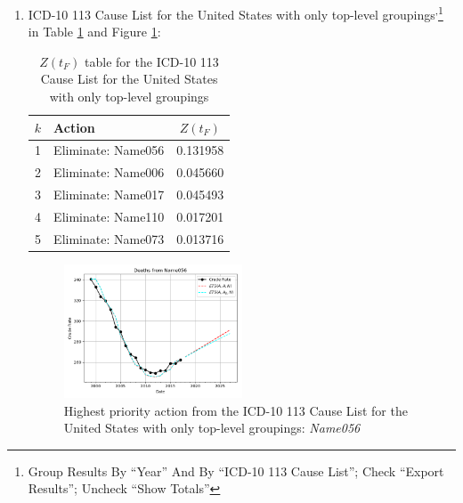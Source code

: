 \documentclass[12pt, a4paper, twocolumn]{article}
\begin{document}
\begin{enumerate}
  \item ICD-10 113 Cause List for the United States with only top-level groupings\cite{centers2017underlying}\textsuperscript{,}\footnote{Group Results By \enquote{Year} And By \enquote{ICD-10 113 Cause List}; Check \enquote{Export Results}; Uncheck \enquote{Show Totals}} in Table \ref{table:ztable3} and Figure \ref{fig:k3}:
    \begin{table}[H]
      \centering
      \begin{tabular}{clc}
        \toprule
          $k$ & Action             & $Z(t_F)$ \\
        \midrule
          1   & Eliminate: Name056 & 0.131958 \\
          2   & Eliminate: Name006 & 0.045660 \\
          3   & Eliminate: Name017 & 0.045493 \\
          4   & Eliminate: Name110 & 0.017201 \\
          5   & Eliminate: Name073 & 0.013716 \\
        \bottomrule
      \end{tabular}
      \caption{$Z(t_F)$ table for the ICD-10 113 Cause List for the United States with only top-level groupings}
      \label{table:ztable3}
    \end{table}
    \begin{figure}[H]
      \centering
      \includegraphics[width=0.5\textwidth]{results/US_ICD10_113_SELECTED_CAUSES_ROOTS/Name056_ets.png}
      \caption{Highest priority action from the ICD-10 113 Cause List for the United States with only top-level groupings: \textit{Name056}}\label{fig:k3}
    \end{figure}


\end{enumerate}
\end{document}
